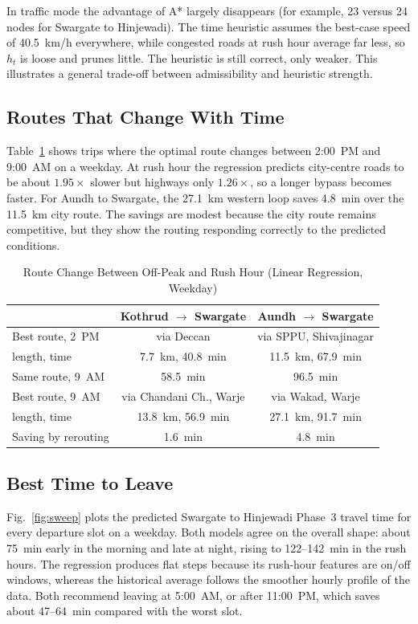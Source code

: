 \documentclass[conference]{IEEEtran}
\begin{document}
In traffic mode the advantage of A* largely disappears (for example, 23
versus 24 nodes for Swargate to Hinjewadi). The time heuristic assumes
the best-case speed of 40.5~km/h everywhere, while congested roads at
rush hour average far less, so $h_t$ is loose and prunes little. The
heuristic is still correct, only weaker. This illustrates a general
trade-off between admissibility and heuristic strength.

\subsection{Routes That Change With Time}
Table~\ref{tab:change} shows trips where the optimal route changes
between 2:00~PM and 9:00~AM on a weekday. At rush hour the regression
predicts city-centre roads to be about $1.95\times$ slower but highways
only $1.26\times$, so a longer bypass becomes faster. For Aundh to
Swargate, the 27.1~km western loop saves 4.8~min over the 11.5~km
city route. The savings are modest because the city route remains
competitive, but they show the routing responding correctly to the
predicted conditions.

\begin{table}[t]
\caption{Route Change Between Off-Peak and Rush Hour (Linear Regression, Weekday)}
\label{tab:change}
\centering
\footnotesize
\setlength{\tabcolsep}{3pt}
\begin{tabular}{@{}lcc@{}}
\toprule
 & Kothrud $\to$ Swargate & Aundh $\to$ Swargate \\
\midrule
Best route, 2~PM         & via Deccan        & via SPPU, Shivajinagar \\
\quad length, time       & 7.7~km, 40.8~min  & 11.5~km, 67.9~min \\
Same route, 9~AM         & 58.5~min          & 96.5~min \\
Best route, 9~AM         & via Chandani Ch., Warje & via Wakad, Warje \\
\quad length, time       & 13.8~km, 56.9~min & 27.1~km, 91.7~min \\
Saving by rerouting      & 1.6~min           & 4.8~min \\
\bottomrule
\end{tabular}
\end{table}

\subsection{Best Time to Leave}
Fig.~\ref{fig:sweep} plots the predicted Swargate to Hinjewadi Phase~3
travel time for every departure slot on a weekday. Both models agree on
the overall shape: about 75~min early in the morning and late at night,
rising to 122--142~min in the rush hours. The regression produces flat
steps because its rush-hour features are on/off windows, whereas the
historical average follows the smoother hourly profile of the data. Both
recommend leaving at 5:00~AM, or after 11:00~PM, which saves about
47--64~min compared with the worst slot.
\end{document}
